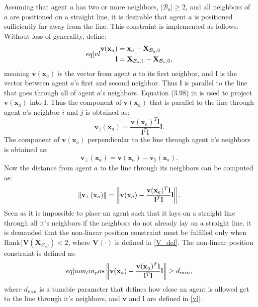 Assuming that agent $a$ has two or more neighbors, $|\mathcal{B}_{a}|\geq 2$, and all neighbors of $a$ are positioned on a straight line, it is desirable that agent $a$ is positioned sufficiently far away from the line. This constraint is implemented as follows:
Without loss of generality, define:
\begin{subequations}\label[eq]{vl}
  \begin{align}
    \mathbf{v}(\mathbf{x}_{a}) &= \mathbf{x}_{a} - \mathbf{X}_{\mathcal{B}_{a}, 0}\\
    \mathbf{l} &= \mathbf{X}_{\mathcal{B}_{a}, 1} - \mathbf{X}_{\mathcal{B}_{a}, 0},
  \end{align}
\end{subequations}
meaning $\mathbf{v}(\mathbf{x}_{a})$ is the vector from agent $a$ to its first neighbor, and $\mathbf{l}$ is the vector between agent $a$'s first and second neighbor. Thus $\mathbf{l}$ is parallel to the line 
that goes through all of agent $a$'s neighbors.
Equation (3.98) in \cite{projection} is used to project $\mathbf{v}(\mathbf{x}_{a})$ into $\mathbf{l}$. Thus the component of $\mathbf{v}(\mathbf{x}_{a})$ that is parallel to the line
through agent $a$'s neighbor $i$ and $j$ is obtained as:
\begin{equation}
  \mathbf{v}_{\parallel}(\mathbf{x}_{a}) = \frac{\mathbf{v}(\mathbf{x}_{a})^{T}\mathbf{l}}{\mathbf{l}^{T}\mathbf{l}}\mathbf{l}.
\end{equation}
The component of $\mathbf{v}(\mathbf{x}_{a})$ perpendicular to the line through agent $a$'s
neighbors is obtained as:
\begin{equation}
  \mathbf{v}_{\perp}(\mathbf{x}_{a}) = \mathbf{v}(\mathbf{x}_{a}) - \mathbf{v}_{\parallel}(\mathbf{x}_{a}).
\end{equation}
Now the distance from agent $a$ to the line through its neighbors can be computed as:
\begin{equation}
  \left\lVert\mathbf{v}_{\perp}(\mathbf{x}_{a})\right\rVert = \left\lVert\mathbf{v}(\mathbf{x}_{a}) - \frac{\mathbf{v}(\mathbf{x}_{a})^{T}\mathbf{l}}{\mathbf{l}^{T}\mathbf{l}}\mathbf{l}\right\rVert.
\end{equation}
Seen as it is impossible to place an agent such that it lays on a straight line through all it's neighbors if the neighbors do not already
lay on a straight line, it is demanded that the non-linear position constraint must be fulfilled only when $\mathrm{Rank}(\mathbf{V}(\mathbf{X}_{\mathcal{B}_{a})}) < 2$, where $\mathbf{V}(\cdot)$ is defined in \eqref{V_def}. The non-linear position constraint is defined as:
\begin{equation}\label[eq]{non_lin_pos}
    \norm{\mathbf{v}(\mathbf{x}_{a}) - \frac{\mathbf{v}(\mathbf{x}_{a})^{T}\mathbf{l}}{\mathbf{l}^{T}\mathbf{l}}\mathbf{l}}\geq d_{min},
\end{equation}
where $d_{min}$ is a tunable parameter that defines how close an agent is allowed get to the line through it's neighbors, and $\mathbf{v}$ and $\mathbf{l}$
are defined in \eqref{vl}.

